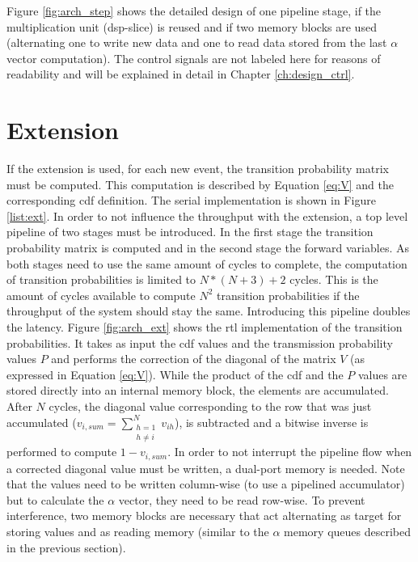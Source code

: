 \documentclass[mscthesis]{usiinfthesis}
\begin{document}
Figure \ref{fig:arch_step} shows the detailed design of one pipeline stage, if
the multiplication unit (\gls{dsp}-slice) is reused and if two memory blocks
are used (alternating one to write new data and one to read data stored from
the last $\alpha$ vector computation). The control signals are not labeled here
for reasons of readability and will be explained in detail in Chapter
\ref{ch:design_ctrl}.

\section{Extension}
\label{ch:design_ext}

If the extension is used, for each new event, the transition probability matrix
must be computed. This computation is described by Equation \ref{eq:V} and the
corresponding \gls{cdf} definition. The serial implementation is shown in
Figure \ref{list:ext}. In order to not influence the throughput with the
extension, a top level pipeline of two stages must be introduced. In the first
stage the transition probability matrix is computed and in the second stage the
forward variables. As both stages need to use the same amount of cycles to
complete, the computation of transition probabilities is limited to $N*(N+3)+2$
cycles. This is the amount of cycles available to compute $N^2$ transition
probabilities if the throughput of the system should stay the same. Introducing
this pipeline doubles the latency. Figure \ref{fig:arch_ext} shows the
\gls{rtl} implementation of the transition probabilities. It takes as input the
\gls{cdf} values and the transmission probability values $P$ and performs the
correction of the diagonal of the matrix $V$ (as expressed in Equation
\ref{eq:V}). While the product of the \gls{cdf} and the $P$ values are stored
directly into an internal memory block, the elements are accumulated. After $N$
cycles, the diagonal value corresponding to the row that was just accumulated
($v_{i, sum} = \sum\limits_{\substack{h=1 \\ h \neq i}}^{N} v_{ih}$), is
subtracted and a bitwise inverse is performed to compute $1 - v_{i, sum}$. In
order to not interrupt the pipeline flow when a corrected diagonal value must
be written, a dual-port memory is needed. Note that the values need to be
written column-wise (to use a pipelined accumulator) but to calculate the
$\alpha$ vector, they need to be read row-wise. To prevent interference, two
memory blocks are necessary that act alternating as target for storing values
and as reading memory (similar to the $\alpha$ memory queues described in the
previous section).
\end{document}
